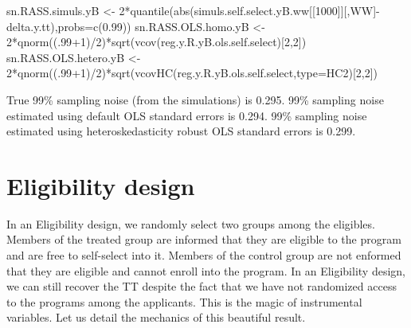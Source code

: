 \documentclass[
]{book}
\newenvironment{Shaded}{\begin{snugshade}}{\end{snugshade}}
\newcommand{\AttributeTok}[1]{\textcolor[rgb]{0.77,0.63,0.00}{#1}}
\newcommand{\DecValTok}[1]{\textcolor[rgb]{0.00,0.00,0.81}{#1}}
\newcommand{\FloatTok}[1]{\textcolor[rgb]{0.00,0.00,0.81}{#1}}
\newcommand{\FunctionTok}[1]{\textcolor[rgb]{0.00,0.00,0.00}{#1}}
\newcommand{\NormalTok}[1]{#1}
\newcommand{\OtherTok}[1]{\textcolor[rgb]{0.56,0.35,0.01}{#1}}
\newcommand{\SpecialCharTok}[1]{\textcolor[rgb]{0.00,0.00,0.00}{#1}}
\newcommand{\StringTok}[1]{\textcolor[rgb]{0.31,0.60,0.02}{#1}}
\theoremstyle{definition}
\theoremstyle{definition}
\theoremstyle{definition}
\theoremstyle{definition}
\theoremstyle{remark}
\begin{document}
\begin{Shaded}
\begin{Highlighting}[]
\NormalTok{sn.RASS.simuls.yB }\OtherTok{\textless{}{-}} \DecValTok{2}\SpecialCharTok{*}\FunctionTok{quantile}\NormalTok{(}\FunctionTok{abs}\NormalTok{(simuls.self.select.yB.ww[[}\StringTok{\textquotesingle{}1000\textquotesingle{}}\NormalTok{]][,}\StringTok{\textquotesingle{}WW\textquotesingle{}}\NormalTok{]}\SpecialCharTok{{-}}\NormalTok{delta.y.tt),}\AttributeTok{probs=}\FunctionTok{c}\NormalTok{(}\FloatTok{0.99}\NormalTok{))}
\NormalTok{sn.RASS.OLS.homo.yB }\OtherTok{\textless{}{-}} \DecValTok{2}\SpecialCharTok{*}\FunctionTok{qnorm}\NormalTok{((.}\DecValTok{99}\SpecialCharTok{+}\DecValTok{1}\NormalTok{)}\SpecialCharTok{/}\DecValTok{2}\NormalTok{)}\SpecialCharTok{*}\FunctionTok{sqrt}\NormalTok{(}\FunctionTok{vcov}\NormalTok{(reg.y.R.yB.ols.self.select)[}\DecValTok{2}\NormalTok{,}\DecValTok{2}\NormalTok{])}
\NormalTok{sn.RASS.OLS.hetero.yB }\OtherTok{\textless{}{-}} \DecValTok{2}\SpecialCharTok{*}\FunctionTok{qnorm}\NormalTok{((.}\DecValTok{99}\SpecialCharTok{+}\DecValTok{1}\NormalTok{)}\SpecialCharTok{/}\DecValTok{2}\NormalTok{)}\SpecialCharTok{*}\FunctionTok{sqrt}\NormalTok{(}\FunctionTok{vcovHC}\NormalTok{(reg.y.R.yB.ols.self.select,}\AttributeTok{type=}\StringTok{\textquotesingle{}HC2\textquotesingle{}}\NormalTok{)[}\DecValTok{2}\NormalTok{,}\DecValTok{2}\NormalTok{])}
\end{Highlighting}
\end{Shaded}

True 99\% sampling noise (from the simulations) is 0.295.
99\% sampling noise estimated using default OLS standard errors is 0.294.
99\% sampling noise estimated using heteroskedasticity robust OLS standard errors is 0.299.

\hypertarget{sec:design3}{%
\section{Eligibility design}\label{sec:design3}}

In an Eligibility design, we randomly select two groups among the eligibles.
Members of the treated group are informed that they are eligible to the program and are free to self-select into it.
Members of the control group are not enformed that they are eligible and cannot enroll into the program.
In an Eligibility design, we can still recover the TT despite the fact that we have not randomized access to the programs among the applicants.
This is the magic of instrumental variables.
Let us detail the mechanics of this beautiful result.
\end{document}
